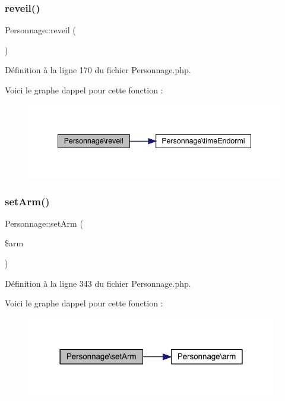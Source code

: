 \subsubsection{\texorpdfstring{reveil()}{reveil()}}
{\footnotesize\ttfamily Personnage\+::reveil (\begin{DoxyParamCaption}{ }\end{DoxyParamCaption})}



Définition à la ligne 170 du fichier Personnage.\+php.

Voici le graphe d\textquotesingle{}appel pour cette fonction \+:\nopagebreak
\begin{figure}[H]
\begin{center}
\leavevmode
\includegraphics[width=341pt]{class_personnage_ab0503fe49e1a5403fe6d43d7d424e3ef_cgraph}
\end{center}
\end{figure}
\mbox{\label{class_personnage_aed5fd24acaa0244d3bafd595b8492507}} 
\subsubsection{\texorpdfstring{set\+Arm()}{setArm()}}
{\footnotesize\ttfamily Personnage\+::set\+Arm (\begin{DoxyParamCaption}\item[{}]{\$arm }\end{DoxyParamCaption})}



Définition à la ligne 343 du fichier Personnage.\+php.

Voici le graphe d\textquotesingle{}appel pour cette fonction \+:\nopagebreak
\begin{figure}[H]
\begin{center}
\leavevmode
\includegraphics[width=310pt]{class_personnage_aed5fd24acaa0244d3bafd595b8492507_cgraph}
\end{center}
\end{figure}
\mbox{\label{class_personnage_a3ba4e51f81e8d865675c1514332c0ac5}} 
